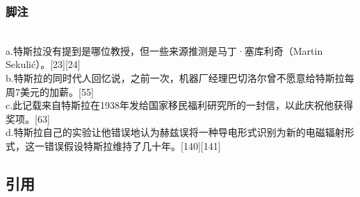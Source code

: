 \subsubsection{脚注}\\  
a.特斯拉没有提到是哪位教授，但一些来源推测是马丁·塞库利奇（Martin Sekulić）。[23][24]\\  
b.特斯拉的同时代人回忆说，之前一次，机器厂经理巴切洛尔曾不愿意给特斯拉每周7美元的加薪。[55]\\  
c.此记载来自特斯拉在1938年发给国家移民福利研究所的一封信，以此庆祝他获得奖项。[63]\\  
d.特斯拉自己的实验让他错误地认为赫兹误将一种导电形式识别为新的电磁辐射形式，这一错误假设特斯拉维持了几十年。[140][141]
\subsection{引用}
